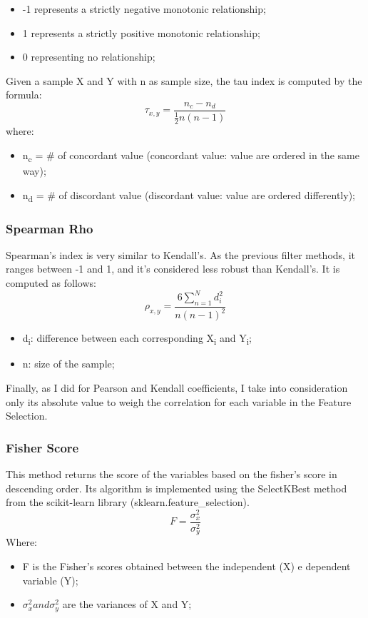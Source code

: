 \begin{itemize}
\item -1 represents a strictly negative monotonic relationship;
\item 1 represents a strictly positive monotonic relationship;
\item 0 representing no relationship;
\end{itemize}
Given a sample X and Y with n as sample size, the tau index is computed by the formula:
\begin{equation}
  \tau_{x,y} = \frac{n_c-n_d}{\frac{1}{2}n(n-1)}
\end{equation}
where:
\begin{itemize}
\item n\textsubscript{c} = \# of concordant value (concordant value: value are ordered in the same way);
\item n\textsubscript{d} = \# of discordant value (discordant value: value are ordered differently);
\end{itemize}
\subsubsection{Spearman Rho}
Spearman’s index is very similar to Kendall’s. As the previous filter methods, it ranges between -1 and 1, and it's considered less robust than Kendall's.
It is computed as follows:
\begin{equation}
\rho_{x,y} = \frac{6\sum_{n=1}^{N} d_i^2}{n(n-1)^2}
\end{equation}
\begin{itemize}
\item d\textsubscript{i}: difference between each corresponding X\textsubscript{i} and Y\textsubscript{i};
\item n: size of the sample;
\end{itemize}

Finally, as I did for Pearson and Kendall coefficients, I take into consideration only its absolute value to weigh the correlation for each variable in the Feature Selection.

\subsubsection{Fisher Score}
This method returns the score of the variables based on the fisher’s score in descending order. \newline
Its algorithm is implemented using the SelectKBest method from the scikit-learn library (sklearn.feature\_selection).\newline
\begin{equation}
F = \frac{\sigma_x^2}{\sigma_y^2}
\end{equation}
Where:
\begin{itemize}
\item F is the Fisher's scores obtained between the independent (X) e dependent variable (Y);
    \item $\sigma_x^2 and\sigma_y^2$ are the variances of X and Y;
\end{itemize}
\bigbreak
